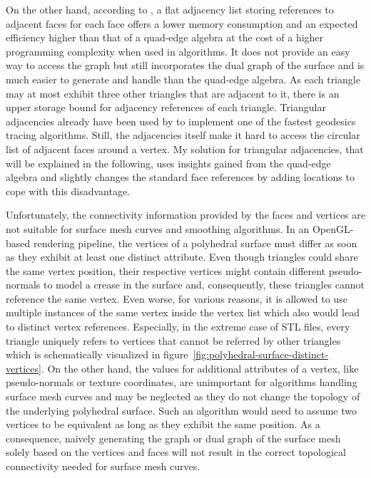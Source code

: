 \documentclass{stdlocal}
\begin{document}
  On the other hand, according to \textcite{shewchuk1996}, a flat adjacency list storing references to adjacent faces for each face offers a lower memory consumption and an expected efficiency higher than that of a quad-edge algebra at the cost of a higher programming complexity when used in algorithms.
  It does not provide an easy way to access the graph but still incorporates the dual graph of the surface and is much easier to generate and handle than the quad-edge algebra.
  As each triangle may at most exhibit three other triangles that are adjacent to it, there is an upper storage bound for adjacency references of each triangle.
  Triangular adjacencies already have been used by \textcite{mancinelli2022} to implement one of the fastest geodesics tracing algorithms.
  Still, the adjacencies itself make it hard to access the circular list of adjacent faces around a vertex.
  My solution for triangular adjacencies, that will be explained in the following, uses insights gained from the quad-edge algebra and slightly changes the standard face references by adding locations to cope with this disadvantage.

  Unfortunately, the connectivity information provided by the faces and vertices are not suitable for surface mesh curves and smoothing algorithms.
  In an OpenGL-based rendering pipeline, the vertices of a polyhedral surface must differ as soon as they exhibit at least one distinct attribute.
  Even though triangles could share the same vertex position, their respective vertices might contain different pseudo-normals to model a crease in the surface and, consequently, these triangles cannot reference the same vertex.
  Even worse, for various reasons, it is allowed to use multiple instances of the same vertex inside the vertex list which also would lead to distinct vertex references.
  Especially, in the extreme case of STL files, every triangle uniquely refers to vertices that cannot be referred by other triangles which is schematically visualized in figure~\ref{fig:polyhedral-surface-distinct-vertices}.
  On the other hand, the values for additional attributes of a vertex, like pseudo-normals or texture coordinates, are unimportant for algorithms handling surface mesh curves and may be neglected as they do not change the topology of the underlying polyhedral surface.
  Such an algorithm would need to assume two vertices to be equivalent as long as they exhibit the same position.
  As a consequence, naively generating the graph or dual graph of the surface mesh solely based on the vertices and faces will not result in the correct topological connectivity needed for surface mesh curves.
\end{document}

